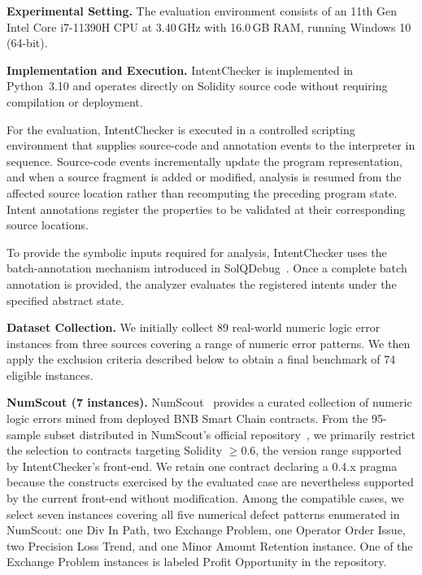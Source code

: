 \documentclass[pdflatex,sn-basic]{sn-jnl}%
\theoremstyle{thmstyleone}%
\theoremstyle{thmstyletwo}%
\theoremstyle{thmstylethree}%
\begin{document}
\noindent\textbf{Experimental Setting.}
The evaluation environment consists of an 11th Gen Intel\textregistered{} Core\texttrademark{}
i7-11390H CPU at 3.40\,GHz with 16.0\,GB RAM, running Windows 10 (64-bit).

\noindent\textbf{Implementation and Execution.}
IntentChecker is implemented in Python~3.10 and operates directly on Solidity source code without requiring compilation or deployment.

For the evaluation, IntentChecker is executed in a controlled scripting environment that supplies source-code and annotation events to the interpreter in sequence. Source-code events incrementally update the program representation, and when a source fragment is added or modified, analysis is resumed from the affected source location rather than recomputing the preceding program state. Intent annotations register the properties to be validated at their corresponding source locations.

To provide the symbolic inputs required for analysis, IntentChecker uses the batch-annotation mechanism introduced in SolQDebug~\citep{solqdebug}. Once a complete batch annotation is provided, the analyzer evaluates the registered intents under the specified abstract state.

\smallskip
\noindent\textbf{Dataset Collection.}
We initially collect 89 real-world numeric logic error instances from three sources covering a range of numeric error patterns.
We then apply the exclusion criteria described below to obtain a final benchmark of 74 eligible instances.

\smallskip\noindent\textbf{NumScout (7 instances).}
NumScout~\citep{numscout} provides a curated collection of numeric logic errors mined from deployed BNB Smart Chain contracts.
From the 95-sample subset distributed in NumScout's official repository~\citep{numscout_dataset},
we primarily restrict the selection to contracts targeting Solidity $\geq$0.6, the version range supported by IntentChecker's front-end.
We retain one contract declaring a 0.4.x pragma because the constructs exercised by the evaluated case are nevertheless supported by the current front-end without modification.
Among the compatible cases, we select seven instances covering all five numerical defect patterns enumerated in NumScout: 
one Div In Path, two Exchange Problem, one Operator Order Issue, two Precision Loss Trend, and one Minor Amount Retention instance. 
One of the Exchange Problem instances is labeled Profit Opportunity in the repository.
\end{document}
